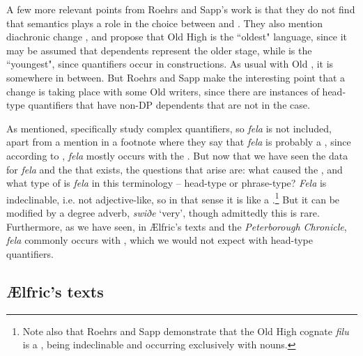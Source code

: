 \documentclass[output=paper,colorlinks,citecolor=brown]{langscibook}
\begin{document}
A few more relevant points from Roehrs and Sapp’s work is that they do not find that semantics plays a role in the choice between  and  \citeyearpar[417]{RoehrsSapp18}. They also mention diachronic change \citeyearpar[416]{RoehrsSapp18}, and propose that Old High  is the “oldest" language, since it may be assumed that  dependents represent the older stage, while  is the “youngest", since quantifiers occur in  constructions. As usual with Old , it is somewhere in between. But Roehrs and Sapp \citeyearpar[416]{RoehrsSapp18} make the interesting point that a change is taking place with some Old  writers, since there are instances of head-type quantifiers that have non-DP dependents that are not in the  case. 

As mentioned, \citet{RoehrsSapp18} specifically study complex quantifiers, so \textit{fela} is not included, apart from a mention in a footnote where they say that \textit{fela} is probably a  \citeyearpar[389]{RoehrsSapp18}, since according to \citet[vol. I, 172]{Mitchell85}, \textit{fela} mostly occurs with the . But now that we have seen the data for \textit{fela} and the  that exists, the questions that arise are: what caused the , and what type of  is \textit{fela }in this terminology – head-type or phrase-type? \textit{Fela} is indeclinable, i.e. not adjective-like, so in that sense it is like a .\footnote{Note also that Roehrs and Sapp \citeyearpar{RoehrsSapp16} demonstrate that the Old High  cognate \textit{filu }is a , being indeclinable and occurring exclusively with  nouns.}  But it can be modified by a degree adverb, \textit{swiðe} ‘very’, though admittedly this is rare. Furthermore, as we have seen, in Ælfric’s texts and the \textit{Peterborough Chronicle}, \textit{fela} commonly occurs with , which we would not expect with head-type quantifiers. 

\subsection{Ælfric's texts}\label{ssect:Ælfric}
\end{document}

